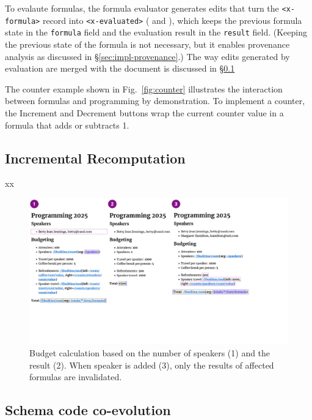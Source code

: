 \documentclass[sigconf]{acmart}
\newcommand*\circled[1]{\textnormal{\footnotesize\sffamily\bfseries\protect\tikz[baseline=(char.base)]{
  \node[shape=circle,fill=black,text=white,draw,inner sep=1pt] (char) {#1};}}}
\begin{document}
To evalaute formulas, the formula evaluator generates edits that turn the {\small\Verb_<x-formula>_}
record into {\small\Verb_<x-evaluated>_} (\circled{2} and \circled{3}), which keeps the previous
formula state in the {\small\Verb_formula_} field and the evaluation result in the {\small\Verb_result_} field.
(Keeping the previous state of the formula is not necessary, but it enables provenance analysis
as discussed in \S\ref{sec:impl-provenance}.) The way edits generated by evaluation are merged
with the document is discussed in \S\ref{sec:impl-incremental}

The counter example shown in Fig.~\ref{fig:counter} illustrates the interaction between formulas
and programming by demonstration. To implement a counter, the Increment and Decrement buttons
wrap the current counter value in a formula that adds or subtracts 1.

\subsection{Incremental Recomputation}
\label{sec:impl-incremental}

xx

\newpage

\begin{figure}[t]
  \includegraphics[width=1\columnwidth,clip,trim=0.1cm 5cm 5.1cm 0cm]{fig/incremental.pdf}
  \vspace{-1em}
  \caption{Budget calculation based on the number of speakers (1) and the result (2). When speaker
  is added (3), only the results of affected formulas are invalidated.}
  \label{fig:incremental}
  \vspace{-0.5em}
\end{figure}

\newpage

\subsection{Schema code co-evolution}
\label{sec:impl-schema}
\end{document}
